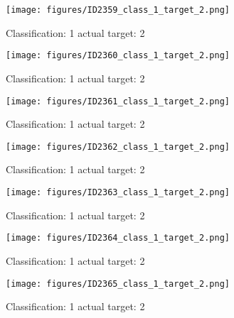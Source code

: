 \begin{figure}[h!]
\begin{center}
\texttt{[image: figures/ID2359\_class\_1\_target\_2.png]}
\end{center}
\caption{ Classification: 1 actual target: 2}
\label{fig:ID2359_class_1_target_2}
\end{figure}
\begin{figure}[h!]
\begin{center}
\texttt{[image: figures/ID2360\_class\_1\_target\_2.png]}
\end{center}
\caption{ Classification: 1 actual target: 2}
\label{fig:ID2360_class_1_target_2}
\end{figure}
\begin{figure}[h!]
\begin{center}
\texttt{[image: figures/ID2361\_class\_1\_target\_2.png]}
\end{center}
\caption{ Classification: 1 actual target: 2}
\label{fig:ID2361_class_1_target_2}
\end{figure}
\begin{figure}[h!]
\begin{center}
\texttt{[image: figures/ID2362\_class\_1\_target\_2.png]}
\end{center}
\caption{ Classification: 1 actual target: 2}
\label{fig:ID2362_class_1_target_2}
\end{figure}
\begin{figure}[h!]
\begin{center}
\texttt{[image: figures/ID2363\_class\_1\_target\_2.png]}
\end{center}
\caption{ Classification: 1 actual target: 2}
\label{fig:ID2363_class_1_target_2}
\end{figure}
\begin{figure}[h!]
\begin{center}
\texttt{[image: figures/ID2364\_class\_1\_target\_2.png]}
\end{center}
\caption{ Classification: 1 actual target: 2}
\label{fig:ID2364_class_1_target_2}
\end{figure}
\begin{figure}[h!]
\begin{center}
\texttt{[image: figures/ID2365\_class\_1\_target\_2.png]}
\end{center}
\caption{ Classification: 1 actual target: 2}
\label{fig:ID2365_class_1_target_2}
\end{figure}

